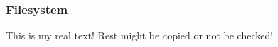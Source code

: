 \subsubsection{Filesystem} \label{subsubsection:evaluation-reengineering-break-filesystem}
This is my real text! Rest might be copied or not be checked!
